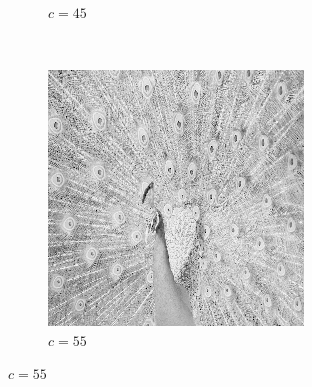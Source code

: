 \documentclass{article}
\begin{document}
\begin{enumerate}[label=(\alph*)]
\begin{figure}[!htb]
\begin{subfigure}[b]{0.3\textwidth}
            \caption{$c = 45$}
        \end{subfigure}
        ~
        \begin{subfigure}[b]{0.3\textwidth}
            \includegraphics[width=\textwidth]{img/LT55.png}
            \caption{$c = 55$}
        \end{subfigure}
        
        

\end{figure}
\end{enumerate}
\end{document}
